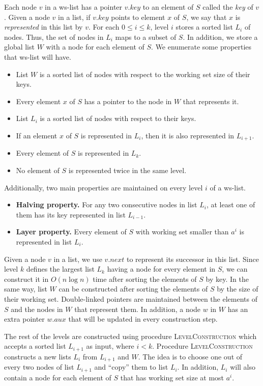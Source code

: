 \documentclass[11pt]{article}       %
\newcommand{\wlist}{ws-list\xspace}
\newcommand{\halving}{Halving property\xspace}
\newcommand{\layer}{Layer property\xspace}
\begin{document}
Each node $v$ in a \wlist has a pointer $v.key$ to an element of $S$ called the \emph{key} of $v$. 
Given a node $v$ in a list, if $v.key$ points to element $x$ of $S$, we say that $x$ is \emph{represented} in this list by $v$.
For each $0\leq i\leq k$, level $i$ stores a sorted list $L_i$ of nodes.
Thus, the set of nodes in $L_i$ maps to a subset of $S$.
In addition, we store a global list $W$ with a node for each element of $S$.
We enumerate some properties that \wlist will have. 
\begin{itemize}
\item List $W$ is a sorted list of nodes with respect to the working set size of their keys.
\item Every element $x$ of $S$ has a pointer to the node in $W$ that represents it.
\item List $L_i$ is a sorted list of nodes with respect to their keys.
\item If an element $x$ of $S$ is represented in $L_i$, then it is also represented in $L_{i+1}$. 
\item Every element of $S$ is represented in $L_k$. 
\item No element of $S$ is represented twice in the same level. 
\end{itemize}

\pagebreak
Additionally, two main properties are maintained on every level $i$ of a \wlist.
\begin{itemize}
\item \textbf{\halving.} For any two consecutive nodes in list $L_i$, at least one of them has its key represented in list $L_{i-1}$.
\item\textbf{\layer.} Every element of $S$ with working set smaller than $a^i$ is represented in list $L_i$.
\end{itemize}


Given a node $v$ in a list, we use $v.next$ to represent its successor in this list.
Since level $k$ defines the largest list $L_k$ having a node for every element in $S$, we can construct it in $O(n\log n)$ time after sorting the elements of $S$ by key. 
In the same way, list $W$ can be constructed after sorting the elements of $S$ by the size of their working set. 
Double-linked pointers are maintained between the elements of $S$ and the nodes in $W$ that represent them.
In addition, a node $w$ in $W$ has an extra pointer $w.aux$ that will be updated in every construction step.

The rest of the levels are constructed using procedure \textsc{LevelConstruction} which accepts a sorted list $L_{i+1}$ as input, where $i < k$. 
Procedure \textsc{LevelConstruction} constructs a new lists $L_{i}$  from $L_{i+1}$ and $W$.
The idea is to choose one out of every two nodes of list $L_{i+1}$ and ``copy'' them to list $L_i$.
In addition, $L_i$ will also contain a node for each element of $S$ that has working set size at most $a^i$.
\end{document}

